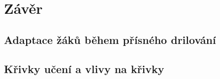 \chapter{Závěr}

\section{Adaptace žáků během přísného drilování}

\section{Křivky učení a vlivy na křivky}


